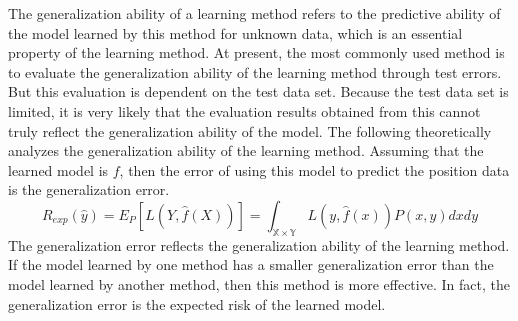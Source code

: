 The generalization ability of a learning method refers to the predictive ability of the model learned by this method for unknown data, which is an essential property of the learning method. At present, the most commonly used method is to evaluate the generalization ability of the learning method through test errors. But this evaluation is dependent on the test data set. Because the test data set is limited, it is very likely that the evaluation results obtained from this cannot truly reflect the generalization ability of the model. The following theoretically analyzes the generalization ability of the learning method. Assuming that the learned model is $f$, then the error of using this model to predict the position data is the generalization error.
$$R_{exp}(\hat{y})=E_P[L(Y,\hat{f}(X))]=\int_{\mathbb{X}\times \mathbb{Y}} L(y,\hat{f}(x))P(x,y)dxdy $$
The generalization error reflects the generalization ability of the learning method. If the model learned by one method has a smaller generalization error than the model learned by another method, then this method is more effective. In fact, the generalization error is the expected risk of the learned model.

